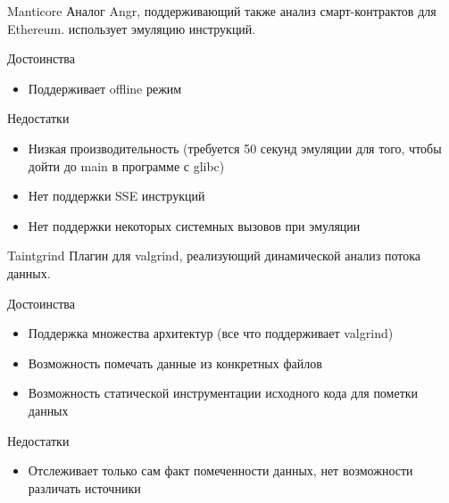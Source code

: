 \documentclass[10pt]{beamer}
\begin{document}
\begin{frame}{Manticore}
    Аналог Angr, поддерживающий также анализ смарт-контрактов для Ethereum. использует эмуляцию инструкций.
    \begin{block}{Достоинства}
      \begin{itemize}
        \item Поддерживает offline режим %
      \end{itemize}
    \end{block}
        \begin{block}{Недостатки}
          \begin{itemize}
      \item Низкая производительность (требуется 50 секунд эмуляции для того, чтобы дойти до main в программе с glibc)
      \item Нет поддержки SSE инструкций
      \item Нет поддержки некоторых системных вызовов при эмуляции
      \end{itemize}
    \end{block}
\end{frame}

\begin{frame}{Taintgrind}
    Плагин для valgrind, реализующий динамической анализ потока данных.
    \begin{block}{Достоинства}
      \begin{itemize}
        \item Поддержка множества архитектур (все что поддерживает valgrind)
        \item Возможность помечать данные из конкретных файлов
        \item Возможность статической инструментации исходного кода для пометки данных
      \end{itemize}
    \end{block}
        \begin{block}{Недостатки}
          \begin{itemize}
      \item Отслеживает только сам факт помеченности данных, нет возможности различать источники
      \end{itemize}
    \end{block}
\end{frame}
\end{document}
